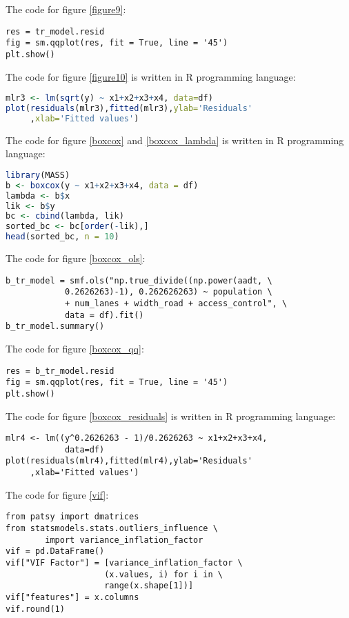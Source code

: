 \documentclass[english]{article}
\begin{document}
The code for figure \ref{figure9}:
\begin{lstlisting}[frame=trBL]
res = tr_model.resid
fig = sm.qqplot(res, fit = True, line = '45')
plt.show()
\end{lstlisting}

The code for figure \ref{figure10} is written in R programming language:
\begin{lstlisting}[frame=trBL, language = R]
mlr3 <- lm(sqrt(y) ~ x1+x2+x3+x4, data=df)
plot(residuals(mlr3),fitted(mlr3),ylab='Residuals'
     ,xlab='Fitted values')
\end{lstlisting}

The code for figure \ref{boxcox} and \ref{boxcox_lambda} is written in R programming language:
\begin{lstlisting}[frame=trBL, language = R]
library(MASS)
b <- boxcox(y ~ x1+x2+x3+x4, data = df)
lambda <- b$x
lik <- b$y
bc <- cbind(lambda, lik)
sorted_bc <- bc[order(-lik),]
head(sorted_bc, n = 10)
\end{lstlisting}

The code for figure \ref{boxcox_ols}:
\begin{lstlisting}[frame=trBL]
b_tr_model = smf.ols("np.true_divide((np.power(aadt, \ 
            0.2626263)-1), 0.262626263) ~ population \ 
            + num_lanes + width_road + access_control", \ 
            data = df).fit()
b_tr_model.summary()
\end{lstlisting}

The code for figure \ref{boxcox_qq}:
\begin{lstlisting}[frame=trBL]
res = b_tr_model.resid
fig = sm.qqplot(res, fit = True, line = '45')
plt.show()
\end{lstlisting}

The code for figure \ref{boxcox_residuals} is written in R programming language:
\begin{lstlisting}[frame=trBL]
mlr4 <- lm((y^0.2626263 - 1)/0.2626263 ~ x1+x2+x3+x4, 
            data=df)
plot(residuals(mlr4),fitted(mlr4),ylab='Residuals'
     ,xlab='Fitted values')
\end{lstlisting}

The code for figure \ref{vif}:
\begin{lstlisting}[frame=trBL]
from patsy import dmatrices
from statsmodels.stats.outliers_influence \ 
        import variance_inflation_factor
vif = pd.DataFrame()
vif["VIF Factor"] = [variance_inflation_factor \
                    (x.values, i) for i in \ 
                    range(x.shape[1])]
vif["features"] = x.columns
vif.round(1)
\end{lstlisting}
\end{document}
